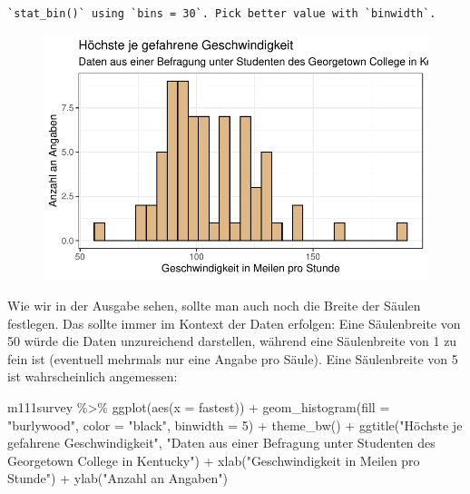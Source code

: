 \documentclass[
  letterpaper,
  DIV=11,
  numbers=noendperiod]{scrartcl}
\newenvironment{Shaded}{\begin{snugshade}}{\end{snugshade}}
\newcommand{\AttributeTok}[1]{\textcolor[rgb]{0.40,0.45,0.13}{#1}}
\newcommand{\DecValTok}[1]{\textcolor[rgb]{0.68,0.00,0.00}{#1}}
\newcommand{\FunctionTok}[1]{\textcolor[rgb]{0.28,0.35,0.67}{#1}}
\newcommand{\NormalTok}[1]{\textcolor[rgb]{0.00,0.23,0.31}{#1}}
\newcommand{\SpecialCharTok}[1]{\textcolor[rgb]{0.37,0.37,0.37}{#1}}
\newcommand{\StringTok}[1]{\textcolor[rgb]{0.13,0.47,0.30}{#1}}
\begin{document}
\begin{verbatim}
`stat_bin()` using `bins = 30`. Pick better value with `binwidth`.
\end{verbatim}

\begin{figure}[H]

{\centering \includegraphics{05-visualisierung_files/figure-pdf/unnamed-chunk-12-1.pdf}

}

\end{figure}

Wie wir in der Ausgabe sehen, sollte man auch noch die Breite der Säulen
festlegen. Das sollte immer im Kontext der Daten erfolgen: Eine
Säulenbreite von 50 würde die Daten unzureichend darstellen, während
eine Säulenbreite von 1 zu fein ist (eventuell mehrmals nur eine Angabe
pro Säule). Eine Säulenbreite von 5 ist wahrscheinlich angemessen:

\begin{Shaded}
\begin{Highlighting}[]
\NormalTok{m111survey }\SpecialCharTok{\%\textgreater{}\%} 
  \FunctionTok{ggplot}\NormalTok{(}\FunctionTok{aes}\NormalTok{(}\AttributeTok{x =}\NormalTok{ fastest)) }\SpecialCharTok{+}
  \FunctionTok{geom\_histogram}\NormalTok{(}\AttributeTok{fill =} \StringTok{"burlywood"}\NormalTok{, }\AttributeTok{color =} \StringTok{"black"}\NormalTok{, }\AttributeTok{binwidth =} \DecValTok{5}\NormalTok{) }\SpecialCharTok{+}
  \FunctionTok{theme\_bw}\NormalTok{() }\SpecialCharTok{+}
  \FunctionTok{ggtitle}\NormalTok{(}\StringTok{"Höchste je gefahrene Geschwindigkeit"}\NormalTok{,}
          \StringTok{"Daten aus einer Befragung unter Studenten des Georgetown College in Kentucky"}\NormalTok{) }\SpecialCharTok{+}
  \FunctionTok{xlab}\NormalTok{(}\StringTok{"Geschwindigkeit in Meilen pro Stunde"}\NormalTok{) }\SpecialCharTok{+}
  \FunctionTok{ylab}\NormalTok{(}\StringTok{"Anzahl an Angaben"}\NormalTok{)}
\end{Highlighting}
\end{Shaded}
\end{document}
